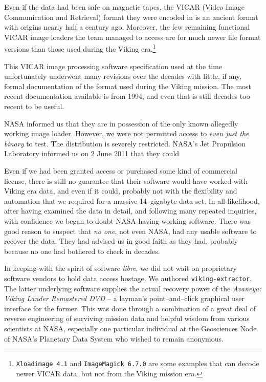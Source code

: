 Even if the data had been safe on magnetic tapes, the VICAR (Video Image Communication and Retrieval) format they were encoded in is an ancient format with origins nearly half a century ago. Moreover, the few remaining functional VICAR image loaders the team managed to access are for much newer file format versions than those used during the Viking era.\footnote{{\tt Xloadimage 4.1} and {\tt ImageMagick 6.7.0} are some examples that can decode newer VICAR data, but not from the Viking mission era.}

This VICAR image processing software specification used at the time unfortunately underwent many revisions over the decades with little, if any, formal documentation of the format used during the Viking mission. The most recent documentation available is from 1994, and even that is still decades too recent to be useful.

NASA informed us that they are in possession of the only known allegedly working image loader. However, we were not permitted access to {\it even just the binary} to test. The distribution is severely restricted. NASA's Jet Propulsion Laboratory informed us on 2 June 2011 that they could 

Even if we had been granted access or purchased some kind of commercial license, there is still no guarantee that their software would have worked with Viking era data, and even if it could, probably not with the flexibility and automation that we required for a massive 14--gigabyte data set. In all likelihood, after having examined the data in detail, and following many repeated inquiries, with confidence we began to doubt NASA having working software. There was good reason to suspect that {\it no one}, not even NASA, had any usable software to recover the data. They had advised us in good faith as they had, probably because no one had bothered to check in decades.


In keeping with the spirit of software {\it libre}, we did not wait on proprietary software vendors to hold data access hostage. We authored {\tt viking-extractor}. The latter underlying software supplies the actual recovery power of the {\it Avaneya: Viking Lander Remastered DVD} -- a layman's point--and--click graphical user interface for the former. This was done through a combination of a great deal of reverse engineering of surviving mission data and helpful wisdom from various scientists at NASA, especially one particular individual at the Geosciences Node of NASA's Planetary Data System who wished to remain anonymous.
    {}

